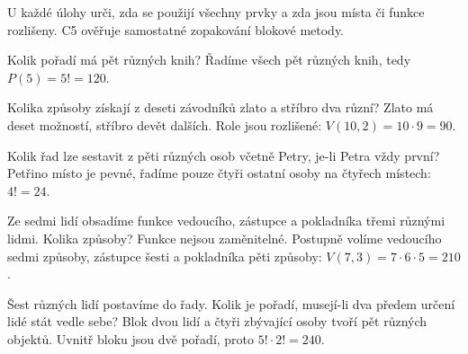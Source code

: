 \documentclass[11pt,a4paper]{article}
\begin{document}
\newpage
{}

U každé úlohy urči, zda se použijí všechny prvky a zda jsou místa či funkce rozlišeny. C5 ověřuje samostatné zopakování blokové metody.

\begin{zadaniReseniBox}[title={Úloha C1}]
Kolik pořadí má pět různých knih?
\tcblower
Řadíme všech pět různých knih, tedy $P(5)=5!=120$.
\end{zadaniReseniBox}

\begin{zadaniReseniBox}[title={Úloha C2}]
Kolika způsoby získají z deseti závodníků zlato a stříbro dva různí?
\tcblower
Zlato má deset možností, stříbro devět dalších. Role jsou rozlišené: $V(10,2)=10\cdot9=90$.
\end{zadaniReseniBox}

\begin{zadaniReseniBox}[title={Úloha C3}]
Kolik řad lze sestavit z pěti různých osob včetně Petry, je-li Petra vždy první?
\tcblower
Petřino místo je pevné, řadíme pouze čtyři ostatní osoby na čtyřech místech: $4!=24$.
\end{zadaniReseniBox}

\begin{zadaniReseniBox}[title={Úloha C4}]
Ze sedmi lidí obsadíme funkce vedoucího, zástupce a pokladníka třemi různými lidmi. Kolika způsoby?
\tcblower
Funkce nejsou zaměnitelné. Postupně volíme vedoucího sedmi způsoby, zástupce šesti a pokladníka pěti způsoby: $V(7,3)=7\cdot6\cdot5=210$.
\end{zadaniReseniBox}

\begin{zadaniReseniBox}[title={Úloha C5}]
Šest různých lidí postavíme do řady. Kolik je pořadí, musejí-li dva předem určení lidé stát vedle sebe?
\tcblower
Blok dvou lidí a čtyři zbývající osoby tvoří pět různých objektů. Uvnitř bloku jsou dvě pořadí, proto $5!\cdot2!=240$.
\end{zadaniReseniBox}


\end{document}
